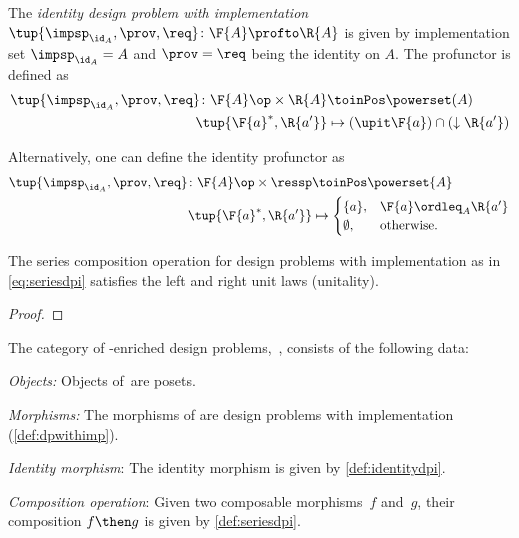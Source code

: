 {    \begin{definition}
        \label{def:identitydpi}
        The \emph{identity design problem with implementation}~$\tup{\impsp_{\id_A},\prov,\req} \colon \F{A} \profto \R{A}$ is given by implementation set $\impsp_{\id_A} = A$ and $\prov=\req$ being
        the identity on $A$.
        The profunctor is defined as
        \begin{align}
            \tup{\impsp_{\id_A},\prov,\req} \colon \F{A}\op \times \R{A} & \toinPos \powerset(A)                          \\
            \tup{\F{a}^*,\R{a'}}                                         & \mapsto (\upit \F{a}) \cap (\downarrow \R{a'}) 
        \end{align}
    \end{definition}
    \begin{remark}
        Alternatively, one can define the identity profunctor as
        \begin{align}
            \tup{\impsp_{\id_A},\prov,\req}\colon \F{A}\op \times \ressp & \toinPos \powerset{A} \\
            \tup{\F{a}^*,\R{a'}}                                         & \mapsto               
            \begin{cases}
                \{a\},     & \F{a}\ordleq_A \R{a'} \\
                \emptyset, & \text{otherwise}.     
            \end{cases}
        \end{align}
    \end{remark}

    \begin{lemma}
        The series composition operation for design problems with implementation as in \cref{eq:seriesdpi} satisfies the left and right unit laws (unitality).
    \end{lemma}

    \begin{proof}
    \end{proof}

    \begin{definition}
        The category of \Set-enriched design problems,~\DPI, consists of the following data:
        \begin{compactenum}
            \item \emph{Objects:}  Objects of~\DPI are posets.
            \item \emph{Morphisms:} The morphisms of \DPI are design problems with implementation (\cref{def:dpwithimp}).
            \item \emph{Identity morphism}: The identity morphism is given by \cref{def:identitydpi}.
            \item \emph{Composition operation}: Given two composable morphisms~$f$ and~$g$, their composition $f\then g$ is given by \cref{def:seriesdpi}.
        \end{compactenum}
    \end{definition}

}
